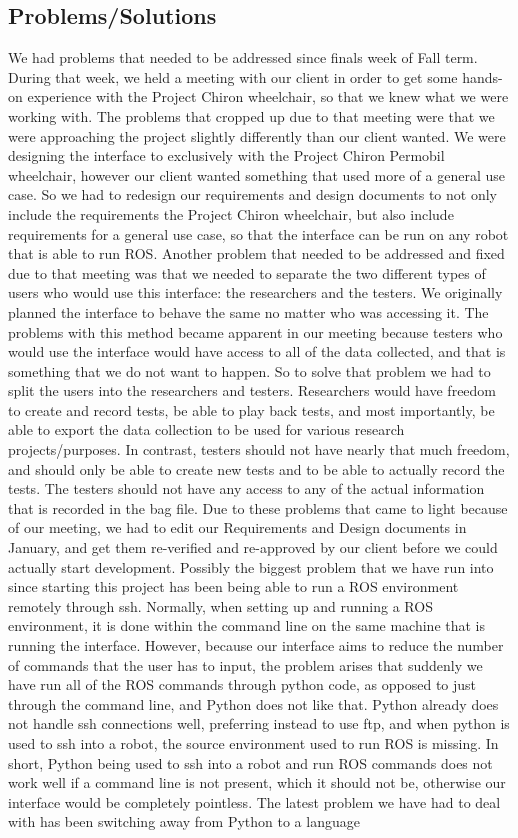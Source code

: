 \documentclass[onecolumn, draftclsnofoot,10pt, compsoc]{IEEEtran}
\begin{document}
\subsection{Problems/Solutions}
We had problems that needed to be addressed since finals week of Fall term. During that week, we held a meeting with our client in order to get some hands-on experience with the Project Chiron wheelchair, so that we knew what we were working with. The problems that cropped up due to that meeting were that we were approaching the project slightly differently than our client wanted. We were designing the interface to exclusively with the Project Chiron Permobil wheelchair, however our client wanted something that used more of a general use case. So we had to redesign our requirements and design documents to not only include the requirements the Project Chiron wheelchair, but also include requirements for a general use case, so that the interface can be run on any robot that is able to run ROS. Another problem that needed to be addressed and fixed due to that meeting was that we needed to separate the two different types of users who would use this interface: the researchers and the testers. We originally planned the interface to behave the same no matter who was accessing it. The problems with this method became apparent in our meeting because testers who would use the interface would have access to all of the data collected, and that is something that we do not want to happen. So to solve that problem we had to split the users into the researchers and testers. Researchers would have freedom to create and record tests, be able to play back tests, and most importantly, be able to export the data collection to be used for various research projects/purposes. In contrast, testers should not have nearly that much freedom, and should only be able to create new tests and to be able to actually record the tests. The testers should not have any access to any of the actual information that is recorded in the bag file. Due to these problems that came to light because of our meeting, we had to edit our Requirements and Design documents in January, and get them re-verified and re-approved by our client before we could actually start development. Possibly the biggest problem that we have run into since starting this project has been being able to run a ROS environment remotely through ssh. Normally, when setting up and running a ROS environment, it is done within the command line on the same machine that is running the interface. However, because our interface aims to reduce the number of commands that the user has to input, the problem arises that suddenly we have run all of the ROS commands through python code, as opposed to just through the command line, and Python does not like that. Python already does not handle ssh connections well, preferring instead to use ftp, and when python is used to ssh into a robot, the source environment used to run ROS is missing. In short, Python being used to ssh into a robot and run ROS commands does not work well if a command line is not present, which it should not be, otherwise our interface would be completely pointless. The latest problem we have had to deal with has been switching away from Python to a language 
\end{document}
